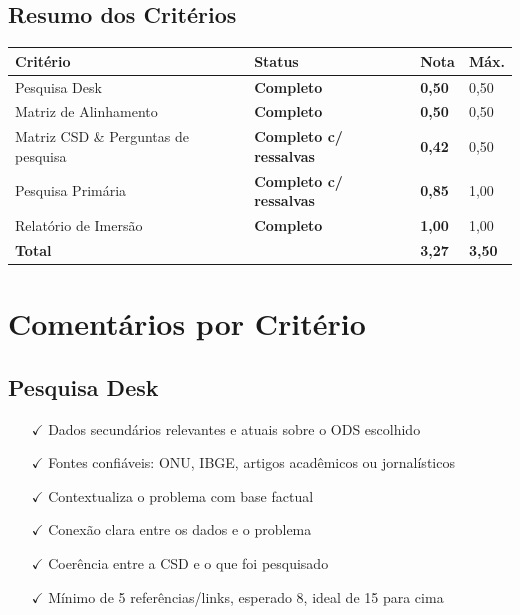 \documentclass[
  sigconf,
  nonacm, %
  language=portuguese
]{acmart}
\newcommand{\statusok}[1]{{\small\bfseries\color{cgood}#1}}
\newcommand{\statuswarn}[1]{{\small\bfseries\color{cwarn}#1}}
\begin{document}
\subsection{Resumo dos Critérios}

\begin{tabular}{@{} L{2.6cm} C{2.5cm} C{1.1cm} C{1.1cm} @{}}
\toprule
\textbf{Critério} & \textbf{Status} & \textbf{Nota} & \textbf{Máx.} \\
\midrule
Pesquisa Desk & \statusok{Completo} & \textbf{0,50} & 0,50 \\
Matriz de Alinhamento & \statusok{Completo} & \textbf{0,50} & 0,50 \\
Matriz CSD \& Perguntas de pesquisa & \statuswarn{Completo c/ ressalvas} & \textbf{0,42} & 0,50 \\
Pesquisa Primária & \statuswarn{Completo c/ ressalvas} & \textbf{0,85} & 1,00 \\
Relatório de Imersão & \statusok{Completo} & \textbf{1,00} & 1,00 \\
\midrule
\textbf{Total} & & \textbf{\color{cred}3,27} & \textbf{3,50} \\
\bottomrule
\end{tabular}

\section{Comentários por Critério}

\subsection{Pesquisa Desk}

\noindent\statusok{0,50\,/\,0,50 pts · Completo}

\begin{itemize}[leftmargin=14pt,itemsep=1pt,topsep=3pt,parsep=0pt]
  \item[\textcolor{cgood}{$\checkmark$}] {\small\textcolor{cgood}{Dados secundários relevantes e atuais sobre o ODS escolhido}}
  \item[\textcolor{cgood}{$\checkmark$}] {\small\textcolor{cgood}{Fontes confiáveis: ONU, IBGE, artigos acadêmicos ou jornalísticos}}
  \item[\textcolor{cgood}{$\checkmark$}] {\small\textcolor{cgood}{Contextualiza o problema com base factual}}
  \item[\textcolor{cgood}{$\checkmark$}] {\small\textcolor{cgood}{Conexão clara entre os dados e o problema}}
  \item[\textcolor{cgood}{$\checkmark$}] {\small\textcolor{cgood}{Coerência entre a CSD e o que foi pesquisado}}
  \item[\textcolor{cgood}{$\checkmark$}] {\small\textcolor{cgood}{Mínimo de 5 referências/links, esperado 8, ideal de 15 para cima}}
\end{itemize}
\end{document}
